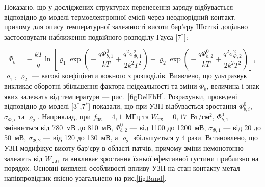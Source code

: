 Показано, що у досліджених структурах перенесення заряду відбувається відповідно до
моделі термоелектронної емісії через неоднорідний контакт,
причому для опису температурної залежності висоти бар'єру Шотткі доцільно
застосовувати наближення подвійного розподілу Гауса
[7$^*$]:

\begin{equation}
\label{eqDG}
  \Phi_{b}\!=\!-\frac{kT}{q}\ln\!\left[\varrho_1\exp\left(\!-\frac{q\Phi_{b,1}^0}{kT}+
  \frac{q^2\sigma^2_{\Phi,1}}{2k^2T^2}\right)
   +
  \varrho_2\exp\left(\!-\frac{q\Phi_{b,2}^{0}}{kT}+
  \frac{q^2\sigma^2_{\Phi,2}}{2k^2T^2}\right)\right],
\end{equation}
$\varrho_1$, $\varrho_2$ --- вагові коефіцієнти кожного з розподілів.
Виявлено, що ультразвук викликає оборотні збільшення фактора неідеальності та зміни $\Phi_{b}$,
величина і знак яких залежать від температури --- рис.~\ref{figDelFbH}.
Розрахунки, проведені відповідно до моделі
[3$^*$,7$^*$] показали, що при УЗН відбувається зростання $\Phi_{b,i}^0$, $\sigma_{\Phi,i}$ та $\varrho_2$.
Наприклад, при $f_\mathtt{US}=4,1$~МГц та $W_\mathtt{US}=0,17$~Вт/см$^2$,
$\Phi_{b,1}^0$ змінюється від 780~мВ до 810~мВ,
$\Phi_{b,2}^0$ --- від 1100 до  1200~мВ,
$\sigma_{\Phi,1}$ --- від 20 до  50~мВ,
$\sigma_{\Phi,2}$ --- від 120 до  130~мВ,
а $\varrho_2$ збільшується у 4 рази.
Встановлено,
що УЗН модифікує висоту бар'єру в області патчів, причому зміни немонотонно залежать від $W_\mathtt{US}$,
та викликає зростання їхньої ефективної густини приблизно на порядок.
Основні виявлені особливості впливу УЗН на стан контакту метал---напівпровідник якісно узагальнено на рис.\ref{figBand}.




